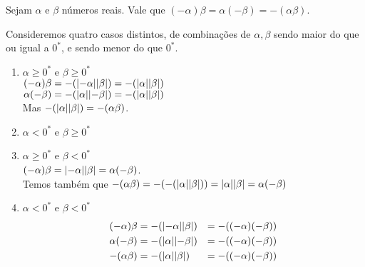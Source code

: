 \documentclass[../main.tex]{subfiles}
\begin{document}
\begin{prop}
    Sejam $\alpha$ e $\beta$ números reais. Vale que $\left( - \alpha \right) \beta = \alpha \left( -\beta \right) = -\left(\alpha \beta \right) $.
\end{prop}
\begin{dem}
    Consideremos quatro casos distintos, de combinações de $\alpha, \beta$ sendo maior do que ou igual a $0^*$, e sendo menor do que $0^*$.
    \begin{enumerate}
        \item $\alpha \geq 0^*$ e $\beta \geq 0^*$ \\
            $(-\alpha)\beta = -(\abs{-\alpha}\abs{\beta}) = -(\abs{\alpha}\abs{\beta})$ \\
            $\alpha(-\beta) = -(\abs{\alpha}\abs{-\beta}) = -(\abs{\alpha}\abs{\beta})$ \\
            Mas $-(\abs{\alpha}\abs{\beta}) = -(\alpha\beta)$.
            
        \item $\alpha < 0^*$ e $\beta \geq 0^*$
        
        \item $\alpha \geq 0^*$ e $\beta < 0^*$ \\
            $(-\alpha)\beta = \abs{-\alpha}\abs{\beta} = \alpha(-\beta)$.  \\
            Temos também que $-(\alpha \beta) = -(- (\abs{\alpha}\abs{\beta} )) = \abs{\alpha}\abs{\beta} = \alpha(-\beta)$
        \item $\alpha < 0^*$ e $\beta < 0^*$ \\
        \begin{align*}
            (-\alpha) \beta &= -(\abs{-\alpha} \abs{\beta}) &= -((-\alpha)(-\beta)) \\
            \alpha (-\beta) &= -(\abs{\alpha}  \abs{-\beta}) &= -((-\alpha)(-\beta)) \\
            -(\alpha \beta) &= -(\abs{\alpha}  \abs{\beta})  &= -((-\alpha)(-\beta))
        \end{align*}
            
    \end{enumerate}
\end{dem}
\end{document}
